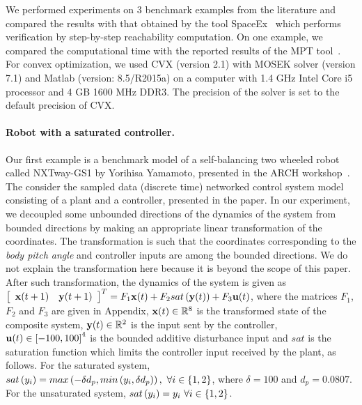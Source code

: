 We performed experiments on $3$ benchmark examples from the literature
and compared the results with that obtained by the tool
SpaceEx~\cite{FLD+11} which performs verification by step-by-step reachability computation. On one example, we compared the computational
time with the reported results of the MPT
tool~\cite{rakovic2004computation}.  For convex optimization, we used
CVX (version 2.1) with MOSEK solver (version 7.1) and Matlab (version:
8.5/R2015a) on a computer with 1.4 GHz Intel Core i5 processor and 4 GB
1600 MHz DDR3.  The precision of the solver is set to the default
precision of CVX.


\paragraph{Robot with a saturated controller.}  Our first example is a benchmark
model of a self-balancing two wheeled robot called NXTway-GS1 by
Yorihisa Yamamoto, presented in the ARCH
workshop~\cite{heinz2014benchmark}. The consider the sampled data
(discrete time) networked control system model consisting of a plant
and a controller, presented in the paper. In our experiment, we
decoupled some unbounded directions of the dynamics of the system from
bounded directions by making an appropriate linear transformation of
the coordinates.  The transformation is such that the coordinates
corresponding to the \emph{body pitch angle} and controller inputs are
among the bounded directions.  We do not explain the transformation
here because it is beyond the scope of this paper.  After such
transformation, the dynamics of the system is given as $
\left[\begin{array}{cc}{\bf x}(t+1) &
    {\bf y}(t+1)\end{array}\right]^T=F_1{\bf x}(t)+F_2sat\left({\bf y}(t)\right)+F_3{\bf u}(t)$,
where the matrices $F_1$, $F_2$ and $F_3$ are given in Appendix, ${\bf x}(t)\in\mathbb{R}^8$ is the
transformed state of the composite system, ${\bf y}(t)\in\mathbb{R}^2$
is the input sent by the controller, ${\bf u}(t)\in\left[-100,100\right]^4$
is the bounded additive disturbance input and $sat$ is the saturation
function which limits the controller input received by the plant, as
follows.  For the saturated system, $sat\left(y_i\right) = max\left(-\delta
d_p,min\left(y_i,\delta d_p\right)\right),~\forall i\in\{1,2\}$, where $\delta=100$
and $d_p=0.0807$.  For the unsaturated system,
$sat\left(y_i\right)=y_i~\forall i\in\{1,2\}$.
%

